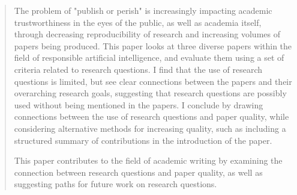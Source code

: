 \begin{quote}
The problem of "publish or perish" is increasingly impacting academic trustworthiness in the eyes of the public, as well as academia itself, through decreasing reproducibility of research and increasing volumes of papers being produced. This paper looks at three diverse papers within the field of responsible artificial intelligence, and evaluate them using a set of criteria related to research questions. I find that the use of research questions is limited, but see clear connections between the papers and their overarching research goals, suggesting that research questions are possibly used without being mentioned in the papers. I conclude by drawing connections between the use of research questions and paper quality, while considering alternative methods for increasing quality, such as including a structured summary of contributions in the introduction of the paper.

This paper contributes to the field of academic writing by examining the connection between research questions and paper quality, as well as suggesting paths for future work on research questions.
\end{quote}